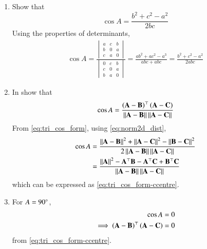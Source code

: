\begin{enumerate}[label=\thesection.\arabic*.,ref=\thesection.\theenumi]
\item Show that 
\begin{equation}
\label{eq:tri_cos_form}
\cos A = \frac{b^2+c^2-a^2}{2bc}
\end{equation}
%
\solution 
Using the properties of determinants,
%
\begin{align}
\cos A = \frac{
\begin{vmatrix}
a & c & b \\
b & 0 & a \\
c & a & 0
\end{vmatrix}
	}
	{
\begin{vmatrix}
0 & c & b \\
c & 0 & a \\
b & a & 0
\end{vmatrix}
	}
	=\frac{ab^2 + ac^2 - a^3}{abc + abc} 
= \frac{b^2 + c^2 - a^2}{2abc}
\end{align}
  \item In 
	show that 
\begin{equation}
	\cos A= 	\frac{\left(\mathbf{A}-
	\mathbf{B}\right)^{\top}\left(\mathbf{A}-\mathbf{C}\right)}{\left\lVert\mathbf{A}-\mathbf{B}\right\rVert\left\lVert\mathbf{A}-\mathbf{C}\right\rVert}
\label{eq:tri_cos_form-ccentre}
\end{equation}
\solution
From 
\eqref{eq:tri_cos_form}, using 
  \eqref{eq:norm2d_dist},
\begin{align}
\label{eq:tri_cos_form-ccentre-norm}
	\cos A&= 	\frac{\left\lVert\mathbf{A}-\mathbf{B}\right\rVert^2+\left\lVert\mathbf{A}-\mathbf{C}\right\rVert^2-\left\lVert\mathbf{B}-\mathbf{C}\right\rVert^2}{2\left\lVert\mathbf{A}-\mathbf{B}\right\rVert\left\lVert\mathbf{A}-\mathbf{C}\right\rVert}
	\\
	&= 	\frac{\left\lVert\mathbf{A}\right\rVert^2-\mathbf{A}^{\top}\mathbf{B}-\mathbf{A}^{\top}\mathbf{C}+\mathbf{B}^{\top}\mathbf{C}}{\left\lVert\mathbf{A}-\mathbf{B}\right\rVert\left\lVert\mathbf{A}-\mathbf{C}\right\rVert}
\end{align}
which can be expressed as 
\eqref{eq:tri_cos_form-ccentre}.
\item For $A = 90 \degree$, 
\begin{align}
	\cos A&= 0
	\\
	\implies 
 	\left(\mathbf{A}-
	\mathbf{B}\right)^{\top}\left(\mathbf{A}-\mathbf{C}\right) &=0
\label{eq:tri_cos_form-orth}
\end{align}
from 
\eqref{eq:tri_cos_form-ccentre}.
\end{enumerate}
